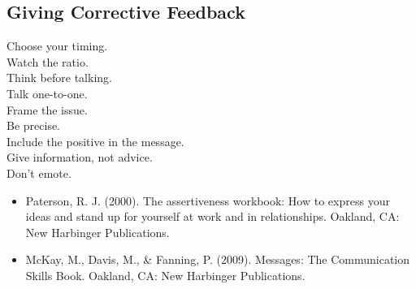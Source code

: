 \documentclass{article}
\begin{document}
\begin{multicols}{3}
	\section*{Giving Corrective Feedback}

        \begin{description}
            \item[Choose your timing.]
            \item[Watch the ratio.]
            \item[Think before talking.]
            \item[Talk one-to-one.]
            \item[Frame the issue.]
            \item[Be precise.]
            \item[Include the positive in the message.]
            \item[Give information, not advice.]
            \item[Don't emote.]
        \end{description}

\end{multicols}

\begin{itemize}
    \item Paterson, R. J. (2000). The assertiveness workbook: How to express your ideas and stand up for yourself at work and in relationships. Oakland, CA: New Harbinger Publications.
    \item McKay, M., Davis, M., \& Fanning, P. (2009). Messages: The Communication Skills Book. Oakland, CA: New Harbinger Publications.
\end{itemize}
\end{document}
